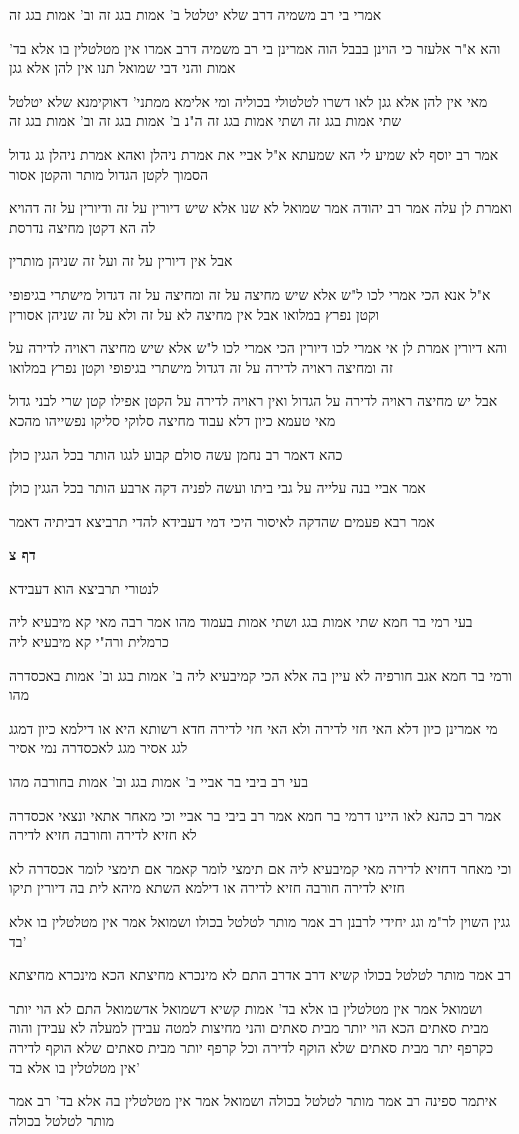 \documentclass[12pt, openany]{book}
\newcommand{\sethebfont}{
\fontsize{10.5pt}{21.0pt} \selectfont
}
\newcommand{\textblock}[1]{
{\sethebfont #1\\}	
}
\newcommand{\sectname}{}
\newcommand{\newsection}[1]{
	\addcontentsline{toc}{section}{#1}
	\renewcommand{\sectname}{#1}	
	\vspace{-\baselineskip}
	\begin{center}
		\textbf{%
\fontsize{16pt}{16pt}\selectfont
			#1}
	\end{center}
	\vspace{-\baselineskip}
	\nopagebreak
}
\begin{document}
\textblock{אמרי בי רב משמיה דרב שלא יטלטל ב' אמות בגג זה וב' אמות בגג זה}
\textblock{והא א"ר אלעזר כי הוינן בבבל הוה אמרינן בי רב משמיה דרב אמרו אין מטלטלין בו אלא בד' אמות והני דבי שמואל תנו אין להן אלא גגן}
\textblock{מאי אין להן אלא גגן לאו דשרו לטלטולי בכוליה ומי אלימא ממתני' דאוקימנא שלא יטלטל שתי אמות בגג זה ושתי אמות בגג זה ה"נ ב' אמות בגג זה וב' אמות בגג זה}
\textblock{אמר רב יוסף לא שמיע לי הא שמעתא א"ל אביי את אמרת ניהלן ואהא אמרת ניהלן גג גדול הסמוך לקטן הגדול מותר והקטן אסור}
\textblock{ואמרת לן עלה אמר רב יהודה אמר שמואל לא שנו אלא שיש דיורין על זה ודיורין על זה דהויא לה הא דקטן מחיצה נדרסת}
\textblock{אבל אין דיורין על זה ועל זה שניהן מותרין}
\textblock{א"ל אנא הכי אמרי לכו ל"ש אלא שיש מחיצה על זה ומחיצה על זה דגדול מישתרי בגיפופי וקטן נפרץ במלואו אבל אין מחיצה לא על זה ולא על זה שניהן אסורין}
\textblock{והא דיורין אמרת לן אי אמרי לכו דיורין הכי אמרי לכו ל"ש אלא שיש מחיצה ראויה לדירה על זה ומחיצה ראויה לדירה על זה דגדול מישתרי בגיפופי וקטן נפרץ במלואו}
\textblock{אבל יש מחיצה ראויה לדירה על הגדול ואין ראויה לדירה על הקטן אפילו קטן שרי לבני גדול מאי טעמא כיון דלא עבוד מחיצה סלוקי סליקו נפשייהו מהכא}
\textblock{כהא דאמר רב נחמן עשה סולם קבוע לגגו הותר בכל הגגין כולן}
\textblock{אמר אביי בנה עלייה על גבי ביתו ועשה לפניה דקה ארבע הותר בכל הגגין כולן}
\textblock{אמר רבא פעמים שהדקה לאיסור היכי דמי דעבידא להדי תרביצא דביתיה דאמר}
\newsection{דף צ}
\textblock{לנטורי תרביצא הוא דעבידא}
\textblock{בעי רמי בר חמא שתי אמות בגג ושתי אמות בעמוד מהו אמר רבה מאי קא מיבעיא ליה כרמלית ורה"י קא מיבעיא ליה}
\textblock{ורמי בר חמא אגב חורפיה לא עיין בה אלא הכי קמיבעיא ליה ב' אמות בגג וב' אמות באכסדרה מהו}
\textblock{מי אמרינן כיון דלא האי חזי לדירה ולא האי חזי לדירה חדא רשותא היא או דילמא כיון דמגג לגג אסיר מגג לאכסדרה נמי אסיר}
\textblock{בעי רב ביבי בר אביי ב' אמות בגג וב' אמות בחורבה מהו}
\textblock{אמר רב כהנא לאו היינו דרמי בר חמא אמר רב ביבי בר אביי וכי מאחר אתאי ונצאי אכסדרה לא חזיא לדירה וחורבה חזיא לדירה}
\textblock{וכי מאחר דחזיא לדירה מאי קמיבעיא ליה אם תימצי לומר קאמר אם תימצי לומר אכסדרה לא חזיא לדירה חורבה חזיא לדירה או דילמא השתא מיהא לית בה דיורין תיקו}
\textblock{גגין השוין לר"מ וגג יחידי לרבנן רב אמר מותר לטלטל בכולו ושמואל אמר אין מטלטלין בו אלא בד'}
\textblock{רב אמר מותר לטלטל בכולו קשיא דרב אדרב התם לא מינכרא מחיצתא הכא מינכרא מחיצתא}
\textblock{ושמואל אמר אין מטלטלין בו אלא בד' אמות קשיא דשמואל אדשמואל התם לא הוי יותר מבית סאתים הכא הוי יותר מבית סאתים והני מחיצות למטה עבידן למעלה לא עבידן והוה כקרפף יתר מבית סאתים שלא הוקף לדירה וכל קרפף יותר מבית סאתים שלא הוקף לדירה אין מטלטלין בו אלא בד'}
\textblock{איתמר ספינה רב אמר מותר לטלטל בכולה ושמואל אמר אין מטלטלין בה אלא בד' רב אמר מותר לטלטל בכולה}
\end{document}
